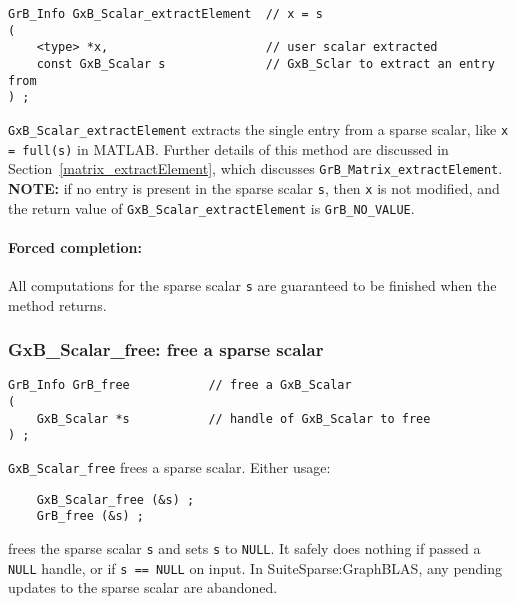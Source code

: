 \documentclass[12pt]{article}
\begin{document}
\begin{mdframed}[userdefinedwidth=6in]
{\footnotesize
\begin{verbatim}
GrB_Info GxB_Scalar_extractElement  // x = s
(
    <type> *x,                      // user scalar extracted
    const GxB_Scalar s              // GxB_Sclar to extract an entry from
) ;
\end{verbatim} } \end{mdframed}

\verb'GxB_Scalar_extractElement' extracts the single entry from a sparse
scalar, like \verb'x = full(s)' in MATLAB.  Further details of this method are
discussed in Section~\ref{matrix_extractElement}, which discusses
\verb'GrB_Matrix_extractElement'.  {\bf NOTE: }  if no entry is present in the
sparse scalar \verb's', then \verb'x' is not modified, and the return value of
\verb'GxB_Scalar_extractElement' is \verb'GrB_NO_VALUE'.

\paragraph{Forced completion:}
All computations for the sparse scalar \verb's' are
guaranteed to be finished when the method returns.

\subsubsection{{\sf GxB\_Scalar\_free:} free a sparse scalar}
\label{scalar_free}

\begin{mdframed}[userdefinedwidth=6in]
{\footnotesize
\begin{verbatim}
GrB_Info GrB_free           // free a GxB_Scalar
(
    GxB_Scalar *s           // handle of GxB_Scalar to free
) ;
\end{verbatim}
} \end{mdframed}

\verb'GxB_Scalar_free' frees a sparse scalar.  Either usage:

    {\small
    \begin{verbatim}
    GxB_Scalar_free (&s) ;
    GrB_free (&s) ; \end{verbatim}}

\noindent
frees the sparse scalar \verb's' and sets \verb's' to \verb'NULL'.  It safely
does nothing if passed a \verb'NULL' handle, or if \verb's == NULL' on input.
In SuiteSparse:GraphBLAS, any pending updates to the sparse scalar are
abandoned.
\end{document}
